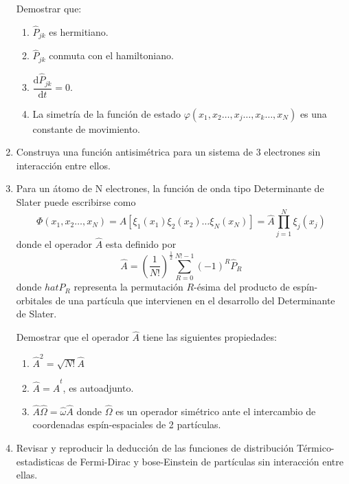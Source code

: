 \documentclass[]{article}
\begin{document}
\begin{enumerate}
Demostrar que:
\begin{enumerate}
\item $\hat{P}_{jk}$ es hermitiano.
\item $\hat{P}_{jk}$ conmuta con el hamiltoniano.
\item $\dfrac{\mathrm{d}\hat{P}_{jk}}{\mathrm{d}t}=0$.
\item La simetría de la función de estado $\varphi\left(x_1, x_2\dots ,x_j\dots ,x_k\dots ,x_N\right)$ es una constante de movimiento.
\end{enumerate}
\item Construya una función antisimétrica para un sistema de 3 electrones sin interacción entre ellos.
\item Para un átomo de N electrones, la función de onda tipo Determinante de Slater puede escribirse como
  \begin{equation*}
    \Phi(x_1,x_2\dots ,x_N)=\hat{A}\left[\xi_1\left(x_1\right)\xi_2\left(x_2\right)\dots \xi_N\left(x_N\right)\right]=\hat{A}\prod_{j=1}^N\xi_j(x_j)
  \end{equation*}
donde el operador $\hat{A}$ esta definido por
\begin{equation*}
  \hat{A}=\left(\frac{1}{N!}\right)^{\frac{1}{2}}\sum_{R=0}^{N!-1}(-1)^R\hat{P}_R
\end{equation*}
donde $hat{P}_R$ representa la permutación $R$-ésima del producto de espín-orbitales de una partícula que intervienen en el desarrollo del Determinante de Slater.

Demostrar que el operador  $\hat{A}$ tiene las siguientes propiedades:
\begin{enumerate}
\item $\hat{A}^2=\sqrt{N!}\hat{A}$
\item $\hat{A}=\hat{A}^t$, es autoadjunto.
\item $\hat{A}\hat{\Omega}=\hat{\omega}\hat{A}$ donde $\hat{\Omega}$ es un operador simétrico ante el intercambio de coordenadas espín-espaciales de 2 partículas.
\end{enumerate}
\item Revisar y reproducir la deducción de las funciones de distribución Térmico-estadisticas de Fermi-Dirac y bose-Einstein de partículas sin interacción entre ellas.
\end{enumerate}
\end{document}
